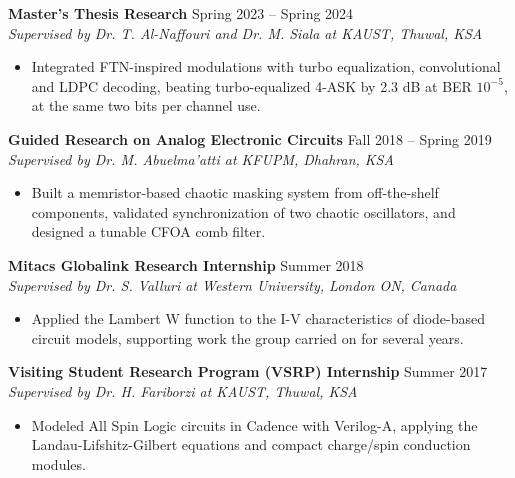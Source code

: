 \documentclass[a4paper,10pt]{article}
\begin{document}
\vspace{0.7mm}
\textbf{Master's Thesis Research} \hfill Spring 2023 – Spring 2024\\
\textit{Supervised by Dr. T. Al-Naffouri and Dr. M. Siala at KAUST, Thuwal, KSA}
\begin{itemize}[left=0pt, label={--}]
    \item Integrated FTN-inspired modulations with turbo equalization, convolutional and LDPC decoding, beating turbo-equalized 4-ASK by 2.3 dB at BER $10^{-5}$, at the same two bits per channel use.
\end{itemize}




\vspace{0.7mm}
\textbf{Guided Research on Analog Electronic Circuits} \hfill Fall 2018 – Spring 2019\\
\textit{Supervised by Dr. M. Abuelma’atti at KFUPM, Dhahran, KSA}
\begin{itemize}[left=0pt, label={--}]
    \item Built a memristor-based chaotic masking system from off-the-shelf components, validated synchronization of two chaotic oscillators, and designed a tunable CFOA comb filter.
\end{itemize}


\vspace{0.7mm}
\textbf{Mitacs Globalink Research Internship} \hfill Summer 2018\\
\textit{Supervised by Dr. S. Valluri at Western University, London ON, Canada}
\begin{itemize}[left=0pt, label={--}]
    \item Applied the Lambert W function to the I-V characteristics of diode-based circuit models, supporting work the group carried on for several years.
\end{itemize}

\vspace{0.7mm}
\textbf{Visiting Student Research Program (VSRP) Internship} \hfill Summer 2017\\
\textit{Supervised by Dr. H. Fariborzi at KAUST, Thuwal, KSA}
\begin{itemize}[left=0pt, label={--}]
    \item Modeled All Spin Logic circuits in Cadence with Verilog-A, applying the Landau-Lifshitz-Gilbert equations and compact charge/spin conduction modules.
\end{itemize}
\end{document}

